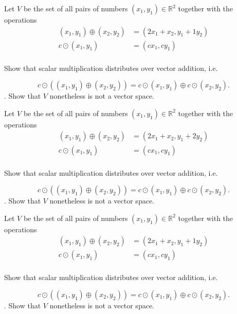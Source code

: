 \documentclass{article}
\begin{document}
\begin{exerciseStatement}
    Let \(V\) be the set of all pairs of numbers \((x_1,y_1)\in\mathbb{R}^2\)  together with the operations
\begin{align*}
(x_1,y_1)\oplus (x_2,y_2)&= (2x_1+x_2, y_1+1y_2)\\
c \odot (x_1,y_1) &= (cx_1,cy_1)\\
\end{align*}

Show that scalar multiplication distributes over vector addition, i.e.

\[c\odot \left((x_1,y_1)\oplus(x_2,y_2)\right)=c\odot(x_1,y_1)\oplus c\odot(x_2,y_2).\]
.
Show that \(V\) nonetheless is not a vector space.



  
\end{exerciseStatement}

\begin{exerciseStatement}
    Let \(V\) be the set of all pairs of numbers \((x_1,y_1)\in\mathbb{R}^2\)  together with the operations
\begin{align*}
(x_1,y_1)\oplus (x_2,y_2)&= (2x_1+x_2, y_1+2y_2)\\
c \odot (x_1,y_1) &= (cx_1,cy_1)\\
\end{align*}

Show that scalar multiplication distributes over vector addition, i.e.

\[c\odot \left((x_1,y_1)\oplus(x_2,y_2)\right)=c\odot(x_1,y_1)\oplus c\odot(x_2,y_2).\]
.
Show that \(V\) nonetheless is not a vector space.



  
\end{exerciseStatement}

\begin{exerciseStatement}
    Let \(V\) be the set of all pairs of numbers \((x_1,y_1)\in\mathbb{R}^2\)  together with the operations
\begin{align*}
(x_1,y_1)\oplus (x_2,y_2)&= (2x_1+x_2, y_1+1y_2)\\
c \odot (x_1,y_1) &= (cx_1,cy_1)\\
\end{align*}

Show that scalar multiplication distributes over vector addition, i.e.

\[c\odot \left((x_1,y_1)\oplus(x_2,y_2)\right)=c\odot(x_1,y_1)\oplus c\odot(x_2,y_2).\]
.
Show that \(V\) nonetheless is not a vector space.



  
\end{exerciseStatement}
\end{document}
